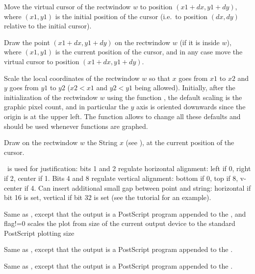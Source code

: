 \label{se:plotrmove}
Move the virtual cursor of the rectwindow $w$ to position
$(x1+dx,y1+dy)$, where $(x1,y1)$ is the initial position of the cursor
(i.e.~to position $(dx,dy)$ relative to the initial cursor).

\label{se:plotrpoint}
Draw the point $(x1+dx,y1+dy)$ on the rectwindow $w$ (if it is inside
$w$), where $(x1,y1)$ is the current position of the cursor, and in any case
move the virtual cursor to position $(x1+dx,y1+dy)$.

\label{se:plotscale}
Scale the local coordinates of the rectwindow $w$ so that $x$ goes from
$x1$ to $x2$ and $y$ goes from $y1$ to $y2$ ($x2<x1$ and $y2<y1$ being
allowed). Initially, after the initialization of the rectwindow $w$ using
the function , the default scaling is the graphic pixel count,
and in particular the $y$ axis is oriented downwards since the origin is at
the upper left. The function  allows to change all these
defaults and should be used whenever functions are graphed.

\label{se:plotstring}
Draw on the rectwindow $w$ the String $x$ (see ), at
the current position of the cursor.

\fl\ is used for justification: bits 1 and 2 regulate horizontal alignment:
left if 0, right if 2, center if 1. Bits 4 and 8 regulate vertical
alignment: bottom if 0, top if 8, v-center if 4. Can insert additional small
gap between point and string: horizontal if bit 16 is set, vertical if bit
32 is set (see the tutorial for an example).

\label{se:psdraw}
Same as , except that the output is a PostScript program
appended to the , and flag!=0 scales the plot from size of the
current output device to the standard PostScript plotting size

\label{se:psploth}
Same as , except that the output is a PostScript program
appended to the .

\label{se:psplothraw}
Same as , except that the output is a PostScript program
appended to the .

